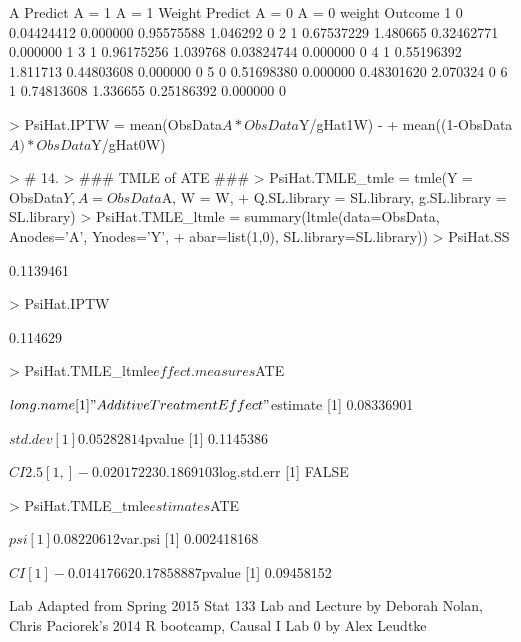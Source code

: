\documentclass[answers]{exam}
\begin{document}
\begin{solution}
\begin{Schunk}
\begin{Soutput}
  A Predict A = 1  A = 1 Weight Predict A = 0 A = 0 weight Outcome
1 0    0.04424412      0.000000    0.95575588     1.046292       0
2 1    0.67537229      1.480665    0.32462771     0.000000       1
3 1    0.96175256      1.039768    0.03824744     0.000000       0
4 1    0.55196392      1.811713    0.44803608     0.000000       0
5 0    0.51698380      0.000000    0.48301620     2.070324       0
6 1    0.74813608      1.336655    0.25186392     0.000000       0
\end{Soutput}
\begin{Sinput}
> PsiHat.IPTW = mean(ObsData$A*ObsData$Y/gHat1W) - 
+   mean((1-ObsData$A)*ObsData$Y/gHat0W)
\end{Sinput}
\end{Schunk}
\begin{Schunk}
\begin{Sinput}
> # 14.
> ### TMLE of ATE ###
> PsiHat.TMLE_tmle = tmle(Y = ObsData$Y, A = ObsData$A, W = W, 
+                         Q.SL.library = SL.library, g.SL.library = SL.library)
> PsiHat.TMLE_ltmle = summary(ltmle(data=ObsData, Anodes='A', Ynodes='Y', 
+                           abar=list(1,0), SL.library=SL.library))
> PsiHat.SS
\end{Sinput}
\begin{Soutput}
[1] 0.1139461
\end{Soutput}
\begin{Sinput}
> PsiHat.IPTW
\end{Sinput}
\begin{Soutput}
[1] 0.114629
\end{Soutput}
\begin{Sinput}
> PsiHat.TMLE_ltmle$effect.measures$ATE
\end{Sinput}
\begin{Soutput}
$long.name
[1] "Additive Treatment Effect"

$estimate
[1] 0.08336901

$std.dev
[1] 0.05282814

$pvalue
[1] 0.1145386

$CI
            2.5%
[1,] -0.02017223 0.1869103

$log.std.err
[1] FALSE
\end{Soutput}
\begin{Sinput}
> PsiHat.TMLE_tmle$estimates$ATE
\end{Sinput}
\begin{Soutput}
$psi
[1] 0.08220612

$var.psi
[1] 0.002418168

$CI
[1] -0.01417662  0.17858887

$pvalue
[1] 0.09458152
\end{Soutput}
\end{Schunk}

\end{solution}

\vfill 
\noindent Lab Adapted from Spring 2015 Stat 133 Lab and Lecture by Deborah Nolan, Chris Paciorek's 2014 R bootcamp, Causal I Lab 0 by Alex Leudtke
\end{document}
